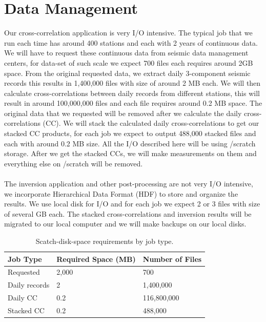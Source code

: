 \documentclass[10pt, letterpaper]{article}
\begin{document}
\section{Data Management}\label{sec:IO}
Our cross-correlation application is very I/O intensive. The typical job that we run each time has around 400 stations and each with 2 years of continuous data. We will have to request these continuous data from seismic data management centers, for data-set of such scale we expect 700 files each requires around 2GB space. From the original requested data, we extract daily 3-component seismic records this results in 1,400,000 files with size of around 2 MB each. We will then calculate cross-correlations between daily records from different stations, this will result in around 100,000,000 files and each file requires around 0.2 MB space. The original data that we requested will be removed after we calculate the daily cross-correlations (CC). We will stack the calculated daily cross-correlations to get our stacked CC products, for each job we expect to output 488,000 stacked files and each with around 0.2 MB size. All the I/O described here will be using /scratch storage. After we get the stacked CCs, we will make measurements on them and everything else on /scratch will be removed. \\ \\
The inversion application and other post-processing are not very I/O intensive, we incorporate Hierarchical Data Format (HDF) to store and organize the results. We use local disk for I/O and for each job we expect 2 or 3 files with size of several GB each. The stacked cross-correlations and inversion results will be migrated to our local computer and we will make backups on our local disks.

\begin{table}[h]
\centering
\begin{tabular}{| l | l | l |}
\hline
  Job Type            & Required Space (MB) & Number of Files  \\ \hline
  Requested  & 2,000                   &           700   \\
  Daily records  & 2                &             1,400,000   \\
  Daily CC & 0.2 & 116,800,000 \\
  Stacked CC & 0.2 & 488,000 \\
\hline
\end{tabular}
\caption{\label{tab:space}Scatch-disk-space requirements by job type.}
\end{table}

\end{document}
